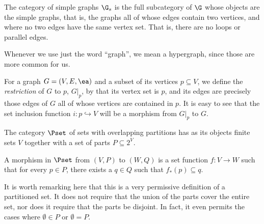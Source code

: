 \documentclass[a4paper,reqno,oneside]{article} %
\begin{document}
\begin{definition}
    The category of simple graphs $\G_s$ is the full subcategory of $\G$ whose objects are the simple graphs, that is, the graphs all of whose edges contain two vertices, and where no two edges have the same vertex set. That is, there are no loops or parallel edges.

    Whenever we use just the word ``graph'', we mean a hypergraph, since those are more common for us.
\end{definition}

\begin{definition}
    For a graph $G = (V,E,\ea)$ and a subset of its vertices $p \subseteq V$, we define the \emph{restriction} of $G$ to $p$, $G|_p$, by that its vertex set is $p$, and its edges are precisely those edges of $G$ all of whose vertices are contained in $p$. It is easy to see that the set inclusion function $i: p \hookrightarrow V$ will be a morphism from $G|_p$ to $G$.
\end{definition}

\begin{definition}
    The category $\Pset$ of sets with overlapping partitions has as its objects finite sets $V$ together with a set of parts $P \subseteq 2^V$.

    A morphism in $\Pset$ from $(V,P)$ to $(W,Q)$ is a set function $f: V \to W$ such that for every $p \in P$, there exists a $q \in Q$ such that $f_*(p) \subseteq q$.
\end{definition}

It is worth remarking here that this is a very permissive definition of a partitioned set. It does not require that the union of the parts cover the entire set, nor does it require that the parts be disjoint. In fact, it even permits the cases where $\emptyset \in P$ or $\emptyset = P$.
\end{document}
